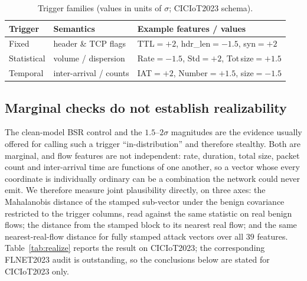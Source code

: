 \begin{table}[t]
\caption{Trigger families (values in units of $\sigma$; CICIoT2023 schema).}
\label{tab:trig}
\centering
\footnotesize
\setlength{\tabcolsep}{4pt}
\begin{tabular}{@{}lll@{}}
\toprule
Trigger & Semantics & Example features / values \\
\midrule
Fixed & header \& TCP flags & TTL$=+2$, hdr\_len$=-1.5$, syn$=+2$ \\
Statistical & volume / dispersion & Rate$=-1.5$, Std$=+2$, Tot\,size$=+1.5$ \\
Temporal & inter-arrival / counts & IAT$=+2$, Number$=+1.5$, size$=-1.5$ \\
\bottomrule
\end{tabular}
\end{table}

\subsection{Marginal checks do not establish realizability}

The clean-model BSR control and the $1.5$--$2\sigma$ magnitudes are the evidence
usually offered for calling such a trigger ``in-distribution'' and therefore
stealthy. Both are marginal, and flow features are not independent: rate,
duration, total size, packet count and inter-arrival time are functions of one
another, so a vector whose every coordinate is individually ordinary can be a
combination the network could never emit. We therefore measure joint
plausibility directly, on three axes: the Mahalanobis distance of the stamped
sub-vector under the benign covariance restricted to the trigger columns, read
against the same statistic on real benign flows; the distance from the stamped
block to its nearest real flow; and the same nearest-real-flow distance for
fully stamped attack vectors over all $39$ features. Table~\ref{tab:realize}
reports the result on CICIoT2023; the corresponding FLNET2023 audit is
outstanding, so the conclusions below are stated for CICIoT2023 only. \PENDING

